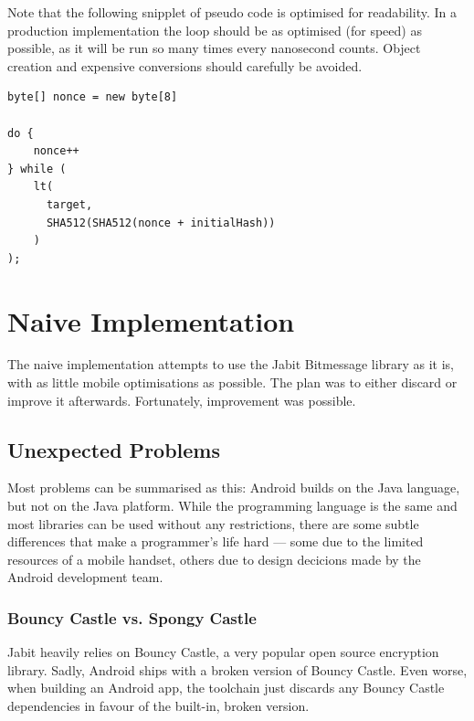 \documentclass{bfh}
\begin{document}
  Note that the following snipplet of pseudo code is optimised for readability. In a production implementation the loop should be as optimised (for speed) as possible, as it will be run so many times every nanosecond counts. Object creation and expensive conversions should carefully be avoided.

\begin{lstlisting}
byte[] nonce = new byte[8]

do {
    nonce++
} while (
    lt(
      target,
      SHA512(SHA512(nonce + initialHash))
    )
);
\end{lstlisting}



  \newpage
  \section{Naive Implementation}
  
  The naive implementation attempts to use the Jabit Bitmessage library as it is, with as little mobile optimisations as possible. The plan was to either discard or improve it afterwards. Fortunately, improvement was possible.

  \subsection{Unexpected Problems}
  Most problems can be summarised as this: Android builds on the Java language, but not on the Java platform. While the programming language is the same and most libraries can be used without any restrictions, there are some subtle differences that make a programmer's life hard --- some due to the limited resources of a mobile handset, others due to design decicions made by the Android development team.
  
  \subsubsection{Bouncy Castle vs. Spongy Castle}
  \label{subsec:bcvssc}
  Jabit heavily relies on Bouncy Castle, a very popular open source encryption library.\cite{bouncy} Sadly, Android ships with a broken version of Bouncy Castle. Even worse, when building an Android app, the toolchain just discards any Bouncy Castle dependencies in favour of the built-in, broken version.
\end{document}
